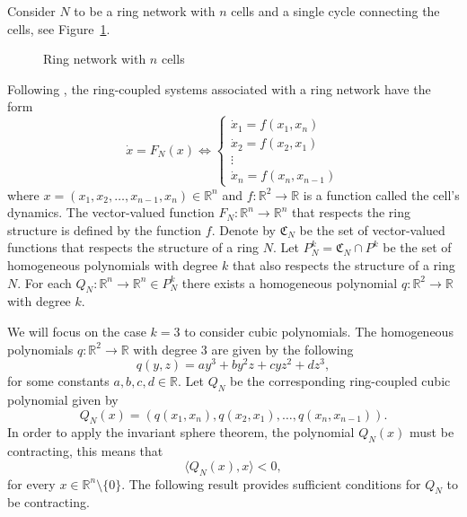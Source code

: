 \documentclass{article}
\theoremstyle{definition}
\begin{document}
Consider $N$ to be a ring network with $n$ cells and a single cycle connecting the cells, see Figure~\ref{fig:ringnetwork}.

\begin{figure}[ht]
\begin{center}
\end{center}
\caption{Ring network with $n$ cells}
\label{fig:ringnetwork}
\end{figure}

Following \cite{GST05}, the ring-coupled systems associated with a ring network have the form
$$
\dot{x}=F_N(x)\Leftrightarrow \begin{cases}
\dot{x}_1=f(x_1,x_n)\\
\dot{x}_2=f(x_2,x_1)\\
\vdots\\
\dot{x}_n=f(x_n,x_{n-1})
\end{cases}$$
where $x=(x_1,x_2,\dots,x_{n-1},x_n)\in\mathbb{R}^n$ and $f:\mathbb{R}^2\rightarrow \mathbb{R}$ is a function called the cell's dynamics. 
The vector-valued function $F_N:\mathbb{R}^n\rightarrow \mathbb{R}^n$ that respects the ring structure is defined by the function $f$. 
Denote by $\mathfrak{C}_N$ be the set of vector-valued functions that respects the structure of a ring $N$.
Let $P_N^{k}=\mathfrak{C}_N\cap P^{k}$ be the set of homogeneous polynomials with degree $k$ that also respects the structure of a ring $N$.
For each $Q_N:\mathbb{R}^n\rightarrow \mathbb{R}^n\in P_N^{k}$ there exists a homogeneous polynomial $q:\mathbb{R}^2\rightarrow \mathbb{R}$ with degree $k$.

We will focus on the case $k=3$ to consider cubic polynomials.
The homogeneous polynomials $q:\mathbb{R}^2\rightarrow \mathbb{R}$ with degree $3$ are given by the following
$$q(y,z)=a y^3+b y^2z+c yz^2+d z^3,$$
for some constants $a,b,c,d\in\mathbb{R}$. Let $Q_N$ be the corresponding ring-coupled cubic polynomial given by 
$$Q_N(x) = (q(x_1,x_n), q(x_2,x_1), \dots, q(x_n,x_{n-1})).$$
In order to apply the invariant sphere theorem, the polynomial $Q_N(x)$ must be contracting, this means that 
$$\langle Q_N(x),x\rangle<0,$$ 
for every $x\in\mathbb{R}^n\setminus \{0\}$.
The following result provides sufficient conditions for $Q_N$ to be contracting.
\end{document}

